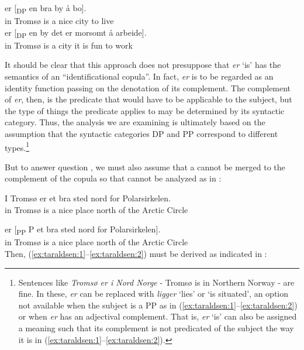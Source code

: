 \documentclass[output=paper]{LSP/langsci}
\begin{document}
\ea%
    \label{ex:taraldsen:24}
    \ea {} er [\textsubscript{DP} en bra by å bo].\\
              {}  in Tromsø is    {}   a nice city to live\\
    \ex {} er [\textsubscript{DP} en by det er morsomt å arbeide].\\
             {} in Tromsø is    {}    a city it is   fun     to work\\
\z\z

It should be clear that this approach does not presuppose that \textit{er} `is' has the semantics of an “identificational copula”. In fact, \textit{er} is to be regarded as an identity function passing on the denotation of its complement. The complement of \textit{er}, then, is the predicate that would have to be applicable to the subject, but the type of things the predicate applies to may be determined by its syntactic category. Thus, the analysis we are examining is ultimately based on the assumption that the syntactic categories DP and PP correspond to different  types.\footnote{\label{fn:taraldsen:6}Sentences like \textit{Tromsø er i Nord Norge} - Tromsø is in Northern Norway - are fine. In these, \textit{er} can be replaced with \textit{ligger} `lies' or `is situated', an option not available when the subject is a PP as in (\ref{ex:taraldsen:1}--\ref{ex:taraldsen:2}) or when \textit{er} has an adjectival complement. That is, \textit{er} `is' can also be assigned a meaning such that its complement is not predicated of the subject the way it is in (\ref{ex:taraldsen:1}--\ref{ex:taraldsen:2}).}

But to answer question , we must also assume that a  cannot be merged to the complement of the copula so that  cannot be analyzed as in :

\begin{exe}
  \gll *  I Tromsø er et bra sted nord for Polarsirkelen.\\
       {} in Tromsø is a nice place north of {the Arctic Circle}\\
\end{exe}

\ea%
    \label{ex:taraldsen:26}
     er {[\textsubscript{PP} P} et bra sted nord for Polarsirkelen].\\
          {}  in Tromsø is    {}     a nice place north of {the Arctic Circle}\\
\z
Then, (\ref{ex:taraldsen:1}--\ref{ex:taraldsen:2}) must be derived as indicated in :
\end{document}
